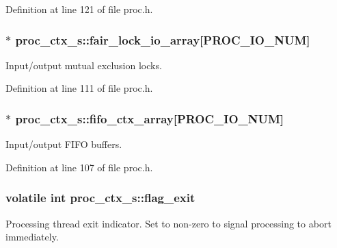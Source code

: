 Definition at line 121 of file proc.\+h.

\subsubsection[{\texorpdfstring{fair\+\_\+lock\+\_\+io\+\_\+array}{fair_lock_io_array}}]{$\ast$ proc\+\_\+ctx\+\_\+s\+::fair\+\_\+lock\+\_\+io\+\_\+array\mbox{[}P\+R\+O\+C\+\_\+\+I\+O\+\_\+\+N\+UM\mbox{]}}\hypertarget{structproc__ctx__s_a6529e1ba97566c429d658e121bb604bb}{}\label{structproc__ctx__s_a6529e1ba97566c429d658e121bb604bb}
Input/output mutual exclusion locks. 

Definition at line 111 of file proc.\+h.

\subsubsection[{\texorpdfstring{fifo\+\_\+ctx\+\_\+array}{fifo_ctx_array}}]{$\ast$ proc\+\_\+ctx\+\_\+s\+::fifo\+\_\+ctx\+\_\+array\mbox{[}P\+R\+O\+C\+\_\+\+I\+O\+\_\+\+N\+UM\mbox{]}}\hypertarget{structproc__ctx__s_a3b71d039235f439a87d9ec7d7b5b5549}{}\label{structproc__ctx__s_a3b71d039235f439a87d9ec7d7b5b5549}
Input/output F\+I\+FO buffers. 

Definition at line 107 of file proc.\+h.

\subsubsection[{\texorpdfstring{flag\+\_\+exit}{flag_exit}}]{\setlength{\rightskip}{0pt plus 5cm}volatile int proc\+\_\+ctx\+\_\+s\+::flag\+\_\+exit}\hypertarget{structproc__ctx__s_a86a21b28f6c41f7a9a4cc9586f782d68}{}\label{structproc__ctx__s_a86a21b28f6c41f7a9a4cc9586f782d68}
Processing thread exit indicator. Set to non-\/zero to signal processing to abort immediately. 

